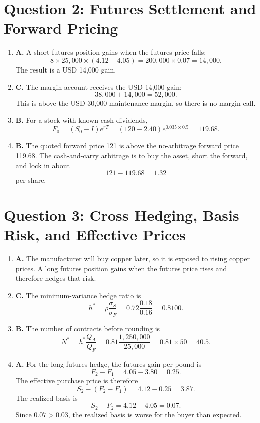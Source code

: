 \documentclass[11pt]{article}
\begin{document}
\section*{Question 2: Futures Settlement and Forward Pricing}

\begin{enumerate}[label=\textbf{2.\arabic*.}]
    \item \textbf{A.} A short futures position gains when the futures price
    falls:
    \[
        8 \times 25{,}000 \times (4.12-4.05)
        = 200{,}000 \times 0.07
        = 14{,}000.
    \]
    The result is a USD 14,000 gain.

    \item \textbf{C.} The margin account receives the USD 14,000 gain:
    \[
        38{,}000+14{,}000=52{,}000.
    \]
    This is above the USD 30,000 maintenance margin, so there is no margin call.

    \item \textbf{B.} For a stock with known cash dividends,
    \[
        F_0=(S_0-I)e^{rT}
        =(120-2.40)e^{0.035\times 0.5}
        =119.68.
    \]

    \item \textbf{B.} The quoted forward price 121 is above the no-arbitrage
    forward price 119.68. The cash-and-carry arbitrage is to buy the asset,
    short the forward, and lock in about
    \[
        121-119.68=1.32
    \]
    per share.
\end{enumerate}

\section*{Question 3: Cross Hedging, Basis Risk, and Effective Prices}

\begin{enumerate}[label=\textbf{3.\arabic*.}]
    \item \textbf{A.} The manufacturer will buy copper later, so it is exposed to
    rising copper prices. A long futures position gains when the futures price
    rises and therefore hedges that risk.

    \item \textbf{C.} The minimum-variance hedge ratio is
    \[
        h^*=\rho\frac{\sigma_S}{\sigma_F}
        =0.72\frac{0.18}{0.16}
        =0.8100.
    \]

    \item \textbf{B.} The number of contracts before rounding is
    \[
        N^*=h^*\frac{Q_A}{Q_F}
        =0.81\frac{1{,}250{,}000}{25{,}000}
        =0.81\times 50
        =40.5.
    \]

    \item \textbf{A.} For the long futures hedge, the futures gain per pound is
    \[
        F_2-F_1=4.05-3.80=0.25.
    \]
    The effective purchase price is therefore
    \[
        S_2-(F_2-F_1)=4.12-0.25=3.87.
    \]
    The realized basis is
    \[
        S_2-F_2=4.12-4.05=0.07.
    \]
    Since $0.07>0.03$, the realized basis is worse for the buyer than expected.
\end{enumerate}
\end{document}
